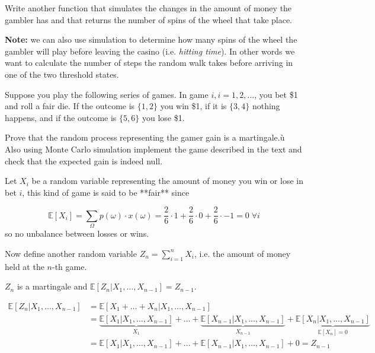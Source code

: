 \documentclass[12pt,a4paper]{book}
\begin{document}
\begin{question}[subtitle=Spin to End  (\texttt{python})]
Write another function that simulates the changes in the amount of money the gambler has and that returns the number of spins of the wheel that take place.

\textbf{Note: } we can also use simulation to determine how many spins of the wheel the gambler will play before leaving the casino (i.e. \emph{hitting time}).
In other words we want to calculate the number of steps the random walk takes before arriving in one of the two threshold states.
\end{question}

\begin{question}[subtitle=Martingale Examples]
Suppose you play the following series of games. In game $i, i = 1, 2,\ldots$, you bet \$1 and roll a fair die. If the outcome is $\{1,2\}$ you win \$1, if it is $\{3,4\}$ nothing happens, and if the outcome is $\{5,6\}$ you lose \$1.

Prove that the random process representing the gamer gain is a martingale.ù
Also using Monte Carlo simulation implement the game described in the text and check that the expected gain is indeed null.
\end{question}

\begin{solution}
Let $X_i$ be a random variable representing the amount of money you win or lose in bet $i$, this kind of game is said to be **fair** since

$$\mathbb{E}[X_i]= \sum_{\Omega}p(\omega)\cdot x(\omega) = \frac{2}{6}\cdot 1 + \frac{2}{6}\cdot 0 + \frac{2}{6}\cdot -1 = 0\;\forall i$$
so no unbalance between losses or wins.

Now define another random variable $Z_n = \sum_{i=1}^{n} X_i$, i.e. the amount of money held at the $n$-th game.

$Z_n$ is a martingale and $\mathbb{E}[Z_n|X_1,\ldots, X_{n-1}] = Z_{n-1}$.

\begin{equation*}
	\begin{aligned}
		\mathbb{E}[Z_n|X_1,\ldots, X_{n-1}] &= \mathbb{E}[X_1 +\ldots + X_n|X_1,\ldots, X_{n-1}] \\
		& = \underbrace{\mathbb{E}[X_1|X_1,\ldots, X_{n-1}]}_{X_1} + \ldots + \underbrace{\mathbb{E}[X_{n-1}|X_1,\ldots, X_{n-1}]}_{X_{n-1}} + \underbrace{\mathbb{E}[X_n|X_1,\ldots, X_{n-1}]}_{\mathbb{E}[X_n]=0} \\
		& = \mathbb{E}[X_1|X_1,\ldots, X_{n-1}] + \ldots + \mathbb{E}[X_{n-1}|X_1,\ldots, X_{n-1}] + 0 = Z_{n-1}
	\end{aligned}
\end{equation*}
\end{solution}
\end{document}

